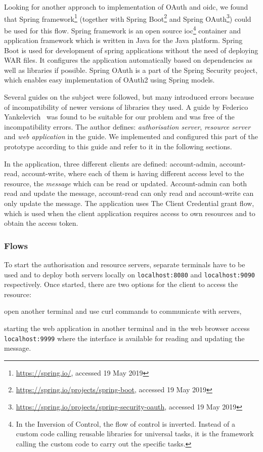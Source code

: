 Looking for another approach to implementation of OAuth and \acrshort{oidc}, we found that Spring framework\footnote{\url{https://spring.io/}, accessed 19 May 2019} (together with Spring Boot\footnote{\url{https://spring.io/projects/spring-boot}, accessed 19 May 2019} and Spring OAuth\footnote{\url{https://spring.io/projects/spring-security-oauth}, accessed 19 May 2019}) could be used for this flow. Spring framework is an open source \acrshort{ioc}\footnote{In the Inversion of Control, the flow of control is inverted. Instead of a custom code calling reusable libraries for universal tasks, it is the framework calling the custom code to carry out the specific tasks.} container and application framework which is written in Java for the Java platform. Spring Boot is used for development of spring applications without the need of deploying WAR files. It configures the application automatically based on dependencies as well as libraries if possible. Spring OAuth is a part of the Spring Security project, which enables easy implementation of OAuth2 using Spring models.

Several guides on the subject were followed, but many introduced errors because of incompatibility of newer versions of libraries they used. A guide by Federico Yankelevich~\cite{Yankelevich2016OAuth2Enterprises} was found to be suitable for our problem and was free of the incompatibility errors. The author defines: \textit{authorisation server}, \textit{resource server} and \textit{web application} in the guide. We implemented and configured this part of the prototype according to this guide and refer to it in the following sections.

In the application, three different clients are defined: account-admin, account-read, account-write, where each of them is having different access level to the resource, the \textit{message} which can be read or updated. Account-admin can both read and update the message, account-read can only read and account-write can only update the message. The application uses The Client Credential grant flow, which is used when the client application requires access to own resources and to obtain the access token.

\subsubsection{Flows}
To start the authorisation and resource servers, separate terminals have to be used and to deploy both servers locally on \texttt{localhost:8080} and \texttt{localhost:9090} respectively. Once started, there are two options for the client to access the resource:
% 
\begin{enumerate*}[label=(\roman*)]
    \item open another terminal and use \acrshort{curl} commands to communicate with servers, 
    \item starting the web application in another terminal and in the web browser access \texttt{localhost:9999} where the interface is available for reading and updating the message.
\end{enumerate*}

